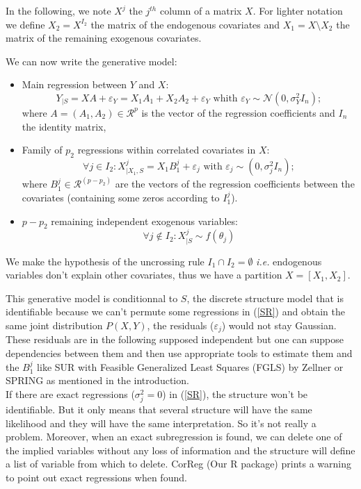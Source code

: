\documentclass[11pt,a4paper]{article}
\begin{document}
In the following, we note $X^j$ the $j^{th}$ column of a matrix $X$.
For lighter notation we define $X_2=X^{I_2}$ the matrix of the endogenous covariates and $X_1=X\setminus X_2$ the matrix of the remaining exogenous covariates. 


We can now write the generative model:
\begin{itemize}
	\item Main regression between $Y$ and $X$:
		\begin{equation}
			Y_{|S}=XA+\varepsilon_Y =X_1A_1+X_2A_2+\varepsilon_Y \textrm{ whith } \varepsilon_Y \sim \mathcal{N}(0,\sigma^2_YI_n);	\label{MainR}
		\end{equation}
		where $A=(A_1,A_2) \in  \mathcal{R}^p$ is the vector of the regression coefficients and $I_n$ the identity matrix, 
	\item Family of $p_2$ regressions within correlated covariates in $X$:
		\begin{equation}
			\forall j \in I_2: X^j_{|X_1,S}=X_1B^j_1+\varepsilon_j \textrm{ with } \varepsilon_j \sim(0,\sigma^2_jI_n); \label{SR}
		\end{equation}
		where $B_1^j \in \mathcal{R}^{(p-p_2)}$ are the vectors of the regression coefficients between the covariates (containing some zeros according to $I_1^j$).
	\item  $p-p_2$ remaining independent exogenous variables:
		\begin{equation}
			\forall j \notin I_2 : X^j_{|S} \sim f(\theta_j)%
		\end{equation}
\end{itemize}

We make the hypothesis of the uncrossing rule $I_1\cap I_2=\emptyset$ {\it i.e.} endogenous variables don't explain other covariates, thus we have a partition $X=[X_1,X_2]$.


This generative model is conditionnal to $S$, the discrete structure model that is identifiable because we can't permute some regressions in (\ref{SR}) and obtain the same joint distribution $P(X,Y)$, the residuals ($\varepsilon_j$) would not stay Gaussian. These residuals are in the following supposed independent but one can suppose dependencies between them and then use appropriate tools to estimate them and the $B_1^j$ like SUR with Feasible Generalized Least Squares (FGLS) by Zellner \cite{SURzellner} or SPRING \cite{chiquetconf} as mentioned in the introduction.
\\
If there are exact regressions ($\sigma^2_j=0$) in (\ref{SR}), the structure won't be identifiable. But it only means that several structure will have the same likelihood and they will have the same interpretation. So it's not really a problem. Moreover, when an exact subregression is found, we can delete one of the implied variables without any loss of information and the structure will define a list of variable from which to delete. CorReg (Our R package) prints a warning to point out exact regressions when found.
	
\end{document}
